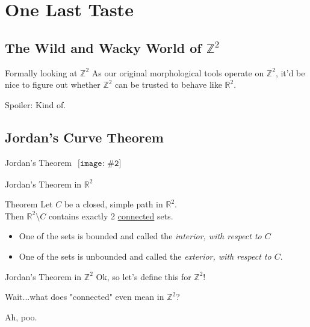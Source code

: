 \documentclass{beamer}
\newcommand{\pic}[2]{
     \begin{array}{l}
      \texttt{[image: \#2]}
      \end{array}
}
\newcommand{\integers}{\mathbb{Z}}
\begin{document}
\section{One Last Taste}
\subsection{The Wild and Wacky World of $\integers^2$}
\begin{frame}{Formally looking at $\integers^2$}
  As our original morphological tools operate on $\integers^2$,
  it'd be nice to figure out whether $\integers^2$ can be trusted
  to behave like $\mathbb{R}^2$.

  Spoiler: Kind of. 
\end{frame}

\subsection{Jordan's Curve Theorem}
\begin{frame}{Jordan's Theorem}
  $\pic{width=300pt}{images/jordans_theorem_r2.png}$
\end{frame}

\begin{frame}{Jordan's Theorem in $\mathbb{R}^2$}

\begin{block}{Theorem}
  Let $C$ be a closed, simple path in $\mathbb{R}^2$.\\
  Then $\mathbb{R}^2 \setminus C$ contains exactly 2 \underline{connected}
  sets.
  \begin{itemize}
     \item One of the sets is bounded and called the \emph{interior, with 
           respect to $C$}
     \item One of the sets is unbounded and called the \emph{exterior,
           with respect to $C$}.
  \end{itemize}
\end{block}
\end{frame}

\begin{frame}{Jordan's Theorem in $\integers^2$}
  Ok, so let's define this for $\integers^2$!

  \pause

  Wait...what does "connected" even mean in $\integers^2$?

  Ah, poo.
\end{frame}
\end{document}
